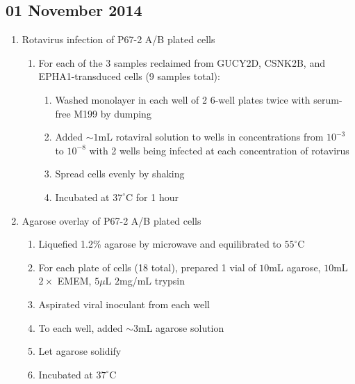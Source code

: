 \subsection*{01 November 2014}

\begin{enumerate}
	\item Rotavirus infection of P67-2 A/B plated cells
		\begin{enumerate}
			\item For each of the 3 samples reclaimed from GUCY2D, CSNK2B, and EPHA1-transduced cells (9 samples total):
				\begin{enumerate}
					\item Washed monolayer in each well of 2 6-well plates twice with serum-free M199 by dumping
					\item Added $\sim 1$mL rotaviral solution to wells in concentrations from $10^{-3}$ to $10^{-8}$ with 2 wells being infected at each concentration of rotavirus
					\item Spread cells evenly by shaking
					\item Incubated at $37^{\circ}$C for 1 hour
				\end{enumerate}
		\end{enumerate}
	\item Agarose overlay of P67-2 A/B plated cells
		\begin{enumerate}
			\item Liquefied 1.2\% agarose by microwave and equilibrated to $55^{\circ}$C
			\item For each plate of cells (18 total), prepared 1 vial of $10$mL agarose, $10$mL $2\times$ EMEM, $5\mu$L $2$mg/mL trypsin
			\item Aspirated viral inoculant from each well
			\item To each well, added $\sim 3$mL agarose solution
			\item Let agarose solidify
			\item Incubated at $37^{\circ}$C
		\end{enumerate}
\end{enumerate}